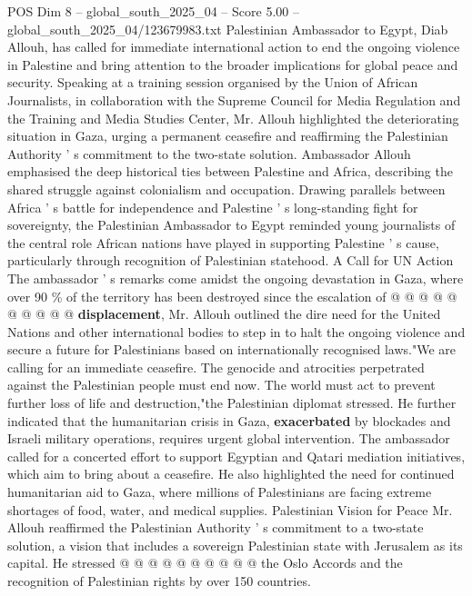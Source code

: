 \begin{textsample}{POS Dim 8 – global\_south\_2025\_04 – Score 5.00 – global\_south\_2025\_04/123679983.txt}  \label{ex:f8_pos_162}
Palestinian Ambassador to Egypt, Diab Allouh, has called for immediate international action to end the ongoing violence in Palestine and bring attention to the broader implications for global peace and security.
Speaking at a training session organised by the Union of African Journalists, in collaboration with the Supreme Council for Media Regulation and the Training and Media Studies Center, Mr.
Allouh highlighted the deteriorating situation in Gaza, urging a permanent ceasefire and reaffirming the Palestinian Authority ' s commitment to the two-state solution.
Ambassador Allouh emphasised the deep historical ties between Palestine and Africa, describing the shared struggle against colonialism and occupation.
Drawing parallels between Africa ' s battle for independence and Palestine ' s long-standing fight for sovereignty, the Palestinian Ambassador to Egypt reminded young journalists of the central role African nations have played in supporting Palestine ' s cause, particularly through recognition of Palestinian statehood.
A Call for UN Action The ambassador ' s remarks come amidst the ongoing devastation in Gaza, where over 90 \% of the territory has been destroyed since the escalation of @ @ @ @ @ @ @ @ @ @ \textbf{displacement}, Mr.
Allouh outlined the dire need for the United Nations and other international bodies to step in to halt the ongoing violence and secure a future for Palestinians based on internationally recognised laws."We are calling for an immediate ceasefire.
The genocide and atrocities perpetrated against the Palestinian people must end now.
The world must act to prevent further loss of life and destruction,"the Palestinian diplomat stressed.
He further indicated that the humanitarian crisis in Gaza, \textbf{exacerbated} by blockades and Israeli military operations, requires urgent global intervention.
The ambassador called for a concerted effort to support Egyptian and Qatari mediation initiatives, which aim to bring about a ceasefire.
He also highlighted the need for continued humanitarian aid to Gaza, where millions of Palestinians are facing extreme shortages of food, water, and medical supplies.
Palestinian Vision for Peace Mr.
Allouh reaffirmed the Palestinian Authority ' s commitment to a two-state solution, a vision that includes a sovereign Palestinian state with Jerusalem as its capital.
He stressed @ @ @ @ @ @ @ @ @ @ the Oslo Accords and the recognition of Palestinian rights by over 150 countries.

\end{textsample}
